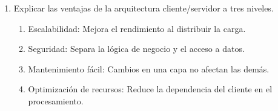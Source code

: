 \begin{enumerate}
    \item Explicar las ventajas de la arquitectura cliente/servidor a tres niveles.
    
    \begin{enumerate}[label=\alph*)]
        \item Escalabilidad: Mejora el rendimiento al distribuir la carga.
        \item Seguridad: Separa la lógica de negocio y el acceso a datos.
        \item Mantenimiento fácil: Cambios en una capa no afectan las demás.
        \item Optimización de recursos: Reduce la dependencia del cliente en el procesamiento.
    \end{enumerate}

\end{enumerate}